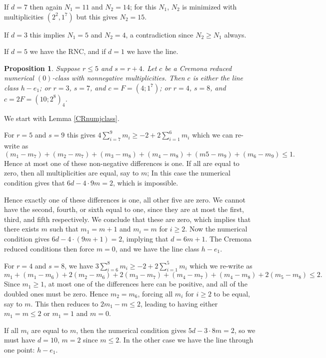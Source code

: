 \documentclass[12pt]{article}
\newtheorem{proposition}[equation]{Proposition}
\numberwithin{equation}{section}
\numberwithin{subeq}{equation}
\begin{document}
If $d=7$ then again $N_1=11$ and $N_2=14$; for this $N_1$, $N_2$ is minimized with multiplicities $(2^2,1^7)$
but this gives $N_2 = 15$.

If $d=3$ this implies $N_1=5$ and $N_2 = 4$, a contradiction since $N_2 \geq N_1$ always.

If $d=5$ we have the RNC, and if $d=1$ we have the line.




\begin{proposition}\label{CRnum0classrleq5}
Suppose $r \leq 5$ and $s=r+4$.
Let $c$ be a Cremona reduced numerical $(0)$-class with nonnegative multiplicities.
Then $c$ is either the line class $h-e_1$;
or $r=3$, $s=7$, and $c = F = (4;1^7)$; 
or $r=4$, $s=8$, and $c=2F=(10;2^8)_4$.
\end{proposition}

\medskip{}
We start with Lemma \ref{CRnumjclass}.

For $r=5$ and $s=9$ this gives
$4\sum_{i=7}^9 m_i \geq -2 +2\sum_{i=1}^{6}m_i$
which we can re-write as
\[
(m_1-m_7)+(m_2-m_7)+(m_3-m_8)+(m_4-m_8)+(m5-m_9)+(m_6-m_9) \leq 1.
\]
Hence at most one of these non-negative differences is one.
If all are equal to zero, then all multiplicities are equal, say to $m$;
In this case the numerical condition gives that $6d-4\cdot 9m = 2$,
which is impossible.

Hence exactly one of these differences is one, all other five are zero.
We cannot have the second, fourth, or sixth equal to one,
since they are at most the first, third, and fifth respectively.
We conclude that these are zero, which implies that there exists $m$
such that $m_1=m+1$ and $m_i=m$ for $i \geq 2$.
Now the numerical condition gives $6d - 4\cdot (9m+1) = 2$,
implying that $d=6m+1$.
The Cremona reduced conditions then force $m=0$,
and we have the line class $h-e_1$.

For $r=4$ and $s=8$, we have
$3\sum_{i=6}^8 m_i \geq -2 + 2 \sum_{i=1}^5 m_i$
which we re-write as
\[
m_1 + (m_1-m_6)+ 2(m_2-m_6) + 2(m_3-m_7) + (m_4-m_7) + (m_4-m_8) + 2(m_5-m_8)
\leq 2.
\]
Since $m_1 \geq 1$, at most one of the differences here can be positive,
and all of the doubled ones must be zero.
Hence $m_2=m_6$, forcing all $m_i$ for $i\geq 2$ to be equal, say to $m$.
This then reduces to $2m_1-m \leq 2$, leading to having either $m_1=m \leq 2$
or $m_1 = 1$ and $m=0$.

If all $m_i$ are equal to $m$, then the numerical condition gives $5d-3\cdot 8m = 2$,
so we must have $d=10$, $m=2$ since $m \leq 2$.
In the other case we have the line through one point: $h-e_1$.
\end{document}
